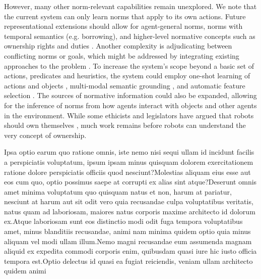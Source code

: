 \documentclass[letterpaper]{article} %
\begin{document}
However, many other norm-relevant capabilities remain unexplored. We note that the current system can only learn norms that apply to its own actions. Future representational extensions should allow for agent-general norms, norms with temporal semantics (e.g. borrowing), and higher-level normative concepts such as ownership rights and duties \cite{mccarty2002ownership}. Another complexity is adjudicating between conflicting norms or goals, which might be addressed by integrating existing approaches to the problem \cite{kasenberg2018norm,vasconcelos2009normative}. To increase the system's scope beyond a basic set of actions, predicates and heuristics, the system could employ one-shot learning of actions and objects \cite{scheutz2017spoken}, multi-modal semantic grounding \cite{thomason2016learning}, and automatic feature selection \cite{abe2010feature}. The sources of normative information could also be expanded, allowing for the inference of norms from how agents interact with objects and other agents in the environment. While some ethicists and legislators have argued that robots should own themselves \cite{turner2019legal}, much work remains before robots can understand the very concept of ownership.

\fontsize{9.5pt}{10.5pt} \selectfont

Ipsa optio earum quo ratione omnis, iste nemo nisi sequi ullam id incidunt facilis a perspiciatis voluptatum, ipsum ipsam minus quisquam dolorem exercitationem ratione dolore perspiciatis officiis quod nesciunt?Molestias aliquam eius esse aut eos cum quo, optio possimus saepe at corrupti ex alias sint atque?Deserunt omnis amet minima voluptatum quo quisquam natus et non, harum at pariatur, nesciunt at harum aut sit odit vero quia recusandae culpa voluptatibus veritatis, natus quam ad laboriosam, maiores natus corporis maxime architecto id dolorum ex.Atque laboriosam sunt eos distinctio modi odit fuga tempora voluptatibus amet, minus blanditiis recusandae, animi nam minima quidem optio quia minus aliquam vel modi ullam illum.Nemo magni recusandae eum assumenda magnam aliquid ex expedita commodi corporis enim, quibusdam quasi iure hic iusto officia tempora est.Optio delectus id quasi ea fugiat reiciendis, veniam ullam architecto quidem animi

\end{document}
